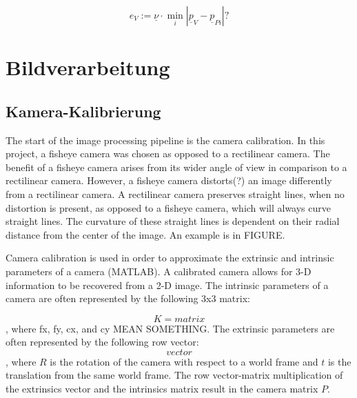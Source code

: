 \documentclass[arbeit=studie,oneside,BCOR=12mm]{ArbeitRST}
\begin{document}
    \begin{equation}
        e_V :=  \underline{\nu} \cdot \min_i |\underline{p}_V -  \underline{p}_{Pi}| ?
        \label{eq:Querabweichung}
    \end{equation}

\chapter{Bildverarbeitung}
\section{Kamera-Kalibrierung}
The start of the image processing pipeline is the camera calibration. In this 
project, a fisheye camera was chosen as opposed to a rectilinear camera. The 
benefit of a 
fisheye camera arises from its wider angle of view in comparison to a 
rectilinear camera. However, a fisheye camera distorts(?) an image differently 
from a rectilinear 
camera. A rectilinear camera preserves straight lines, when no distortion is 
present, as opposed to a fisheye camera, which will always curve straight lines. 
The 
curvature of these straight lines is dependent on their radial distance from 
the center of the image.  An example is in FIGURE.

Camera calibration is used in order to approximate the extrinsic and intrinsic 
parameters of a camera (MATLAB). A calibrated camera allows for 3-D information
to be recovered from a 2-D image. The intrinsic parameters of a camera are often 
represented by the following 3x3 matrix:

$$K = matrix$$, where fx, fy, cx, and cy MEAN SOMETHING. The extrinsic
parameters are often represented by the following row vector:
$$vector$$, where $R$ is the rotation of the camera with respect to a world 
frame and $t$ is the translation from the same world frame. The row 
vector-matrix multiplication of the extrinsics vector and the intrinsics matrix
result in the camera matrix $P$.
\end{document}
